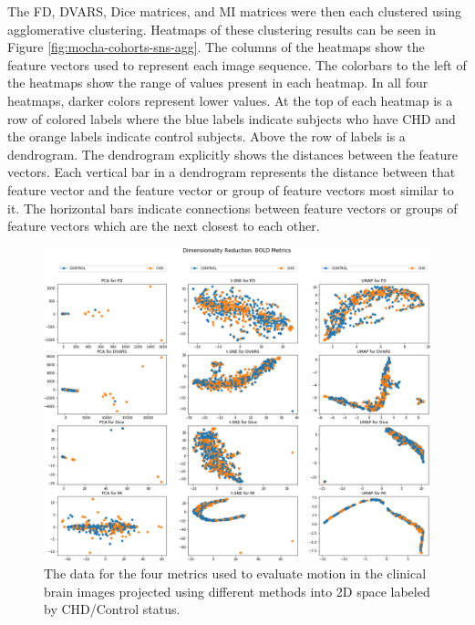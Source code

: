 The FD, DVARS, Dice matrices, and MI matrices were then each clustered using agglomerative clustering. Heatmaps of these clustering results can be seen in Figure \ref{fig:mocha-cohorts-sns-agg}. The columns of the heatmaps show the feature vectors used to represent each image sequence. The colorbars to the left of the heatmaps show the range of values present in each heatmap. In all four heatmaps, darker colors represent lower values. At the top of each heatmap is a row of colored labels where the blue labels indicate subjects who have CHD and the orange labels indicate control subjects. Above the row of labels is a dendrogram. The dendrogram explicitly shows the distances between the feature vectors. Each vertical bar in a dendrogram represents the distance between that feature vector and the feature vector or group of feature vectors most similar to it. The horizontal bars indicate connections between feature vectors or groups of feature vectors which are the next closest to each other.


\begin{figure}
\centering
\includegraphics[width=.9\textwidth]{6/figures/bold-2d-all-cohort.png}
\caption{The data for the four metrics used to evaluate motion in the clinical brain images projected using different methods into 2D space labeled by CHD/Control status.}
\label{fig:mocha-cohorts-data-2d}
\end{figure}

